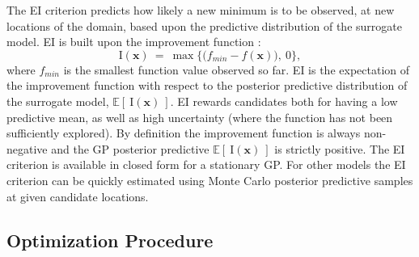 \documentclass[12pt]{article}
\def \Eix {
        \mathbb{E}\left[~\text{I}(\bm{x})~\right]
}
\def \ix {
        \text{I}(\bm{x})
}
\begin{document}
%
The EI criterion predicts how likely a new minimum is to be observed, at new locations of the domain, based upon the predictive distribution of the surrogate model.  
%
EI is built upon the improvement function \citep{jonesEIOpt}:
%
\begin{equation}
\ix~=~ \max \Big\{ \big(f_{min} - f(\bm{x})\big), ~0 \Big\},
\label{ix}
\end{equation}
%
where $f_{min}$ is the smallest function value observed so far.  
%
EI is the expectation of the improvement function with respect to the posterior predictive distribution of the surrogate model, $\Eix$.
%
EI rewards candidates both for having a low predictive mean, as well as high uncertainty (where the function has not been sufficiently explored).
%
By definition the improvement function is always non-negative and the GP posterior predictive $\Eix$ is strictly positive.
%
The EI criterion is available in closed form for a stationary GP.
%
For other models the EI criterion can be quickly estimated using Monte Carlo posterior predictive samples at given candidate locations.

\clearpage
%
%
\subsection{Optimization Procedure}
%
%
\end{document}
